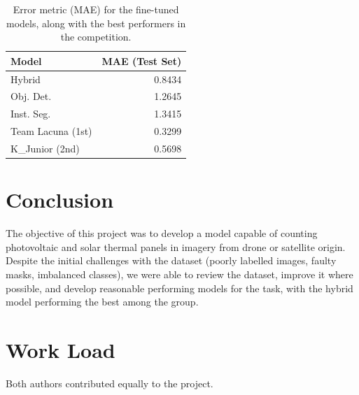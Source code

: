 \documentclass[conference]{IEEEtran}
\begin{document}
\begin{table}[H]
\centering
\caption{Error metric (MAE) for the fine-tuned models, along with the best performers in the competition.}
\label{tab:model02_results_transposed}
\begin{tabular}{lr}
\toprule
\textbf{Model} & \textbf{MAE (Test Set)} \\
\midrule
Hybrid & 0.8434 \\
Obj. Det. & 1.2645 \\
Inst. Seg. & 1.3415 \\
Team Lacuna (1st) & 0.3299 \\
K\_Junior (2nd) & 0.5698 \\
\bottomrule
\end{tabular}
\end{table}




\section{Conclusion}

The objective of this project was to develop a model capable of counting photovoltaic and solar thermal panels in imagery from drone or satellite origin. Despite the initial challenges with the dataset (poorly labelled images, faulty masks, imbalanced classes), we were able to review the dataset, improve it where possible, and develop reasonable performing models for the task, with the hybrid model performing the best among the group.


\section*{Work Load}

Both authors contributed equally to the project.



\end{document}
